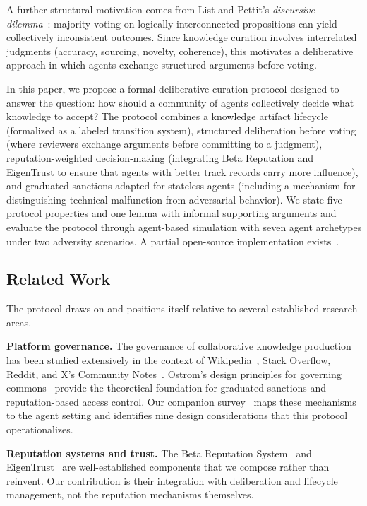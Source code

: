 \documentclass[11pt]{article}
\begin{document}
A further structural motivation comes from List and Pettit's \textit{discursive dilemma}~\cite{list2002}: majority voting on logically interconnected propositions can yield collectively inconsistent outcomes. Since knowledge curation involves interrelated judgments (accuracy, sourcing, novelty, coherence), this motivates a deliberative approach in which agents exchange structured arguments before voting.

In this paper, we propose a formal deliberative curation protocol designed to answer the question: how should a community of agents collectively decide what knowledge to accept? The protocol combines a knowledge artifact lifecycle (formalized as a labeled transition system), structured deliberation before voting (where reviewers exchange arguments before committing to a judgment), reputation-weighted decision-making (integrating Beta Reputation and EigenTrust to ensure that agents with better track records carry more influence), and graduated sanctions adapted for stateless agents (including a mechanism for distinguishing technical malfunction from adversarial behavior). We state five protocol properties and one lemma with informal supporting arguments and evaluate the protocol through agent-based simulation with seven agent archetypes under two adversity scenarios. A partial open-source implementation exists~\cite{johnson2026a}.

\subsection{Related Work}

The protocol draws on and positions itself relative to several established research areas.

\textbf{Platform governance.} The governance of collaborative knowledge production has been studied extensively in the context of Wikipedia~\cite{ostrom1990, hess2007}, Stack Overflow, Reddit, and X's Community Notes~\cite{communitynotes2023, wojcik2022}. Ostrom's design principles for governing commons~\cite{ostrom1990} provide the theoretical foundation for graduated sanctions and reputation-based access control. Our companion survey~\cite{johnson2026b} maps these mechanisms to the agent setting and identifies nine design considerations that this protocol operationalizes.

\textbf{Reputation systems and trust.} The Beta Reputation System~\cite{josang2002} and EigenTrust~\cite{kamvar2003} are well-established components that we compose rather than reinvent. Our contribution is their integration with deliberation and lifecycle management, not the reputation mechanisms themselves.
\end{document}
